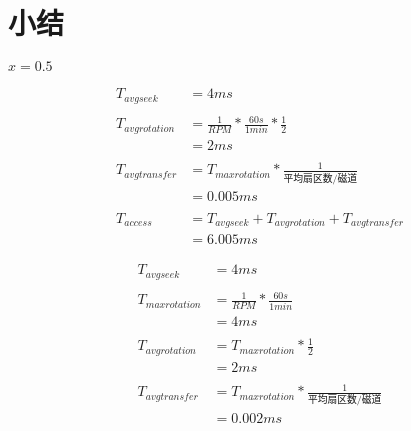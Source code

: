 
\section{小结}
{
    \begin{practicec}
        $x = 0.5$
    \end{practicec}

    \begin{practicec}
        \begin{align*}
            T_{avg seek} &= 4ms \\
            \\
            T_{avg rotation} &= \frac{1}{RPM} * \frac{60s}{1min} * \frac{1}{2} \\
            &= 2ms \\
            \\
            T_{avg transfer} &= T_{max rotation} * \frac{1}{\text{平均扇区数/磁道}} \\
            &= 0.005ms \\
            \\
            T_{access}
            &= T_{avg seek} + T_{avg rotation} + T_{avg transfer} \\
            &= 6.005ms
        \end{align*}
    \end{practicec}

    \begin{practicec}
        \begin{align*}
            T_{avg seek} &= 4ms \\
            \\
            T_{max rotation} &= \frac{1}{RPM} * \frac{60s}{1min} \\
            &= 4ms\\
            \\
            T_{avg rotation} &= T_{max rotation} * \frac{1}{2} \\
            &= 2ms \\
            \\
            T_{avg transfer} &= T_{max rotation} * \frac{1}{\text{平均扇区数/磁道}} \\
            &= 0.002ms
        \end{align*}


\end{practicec}}
